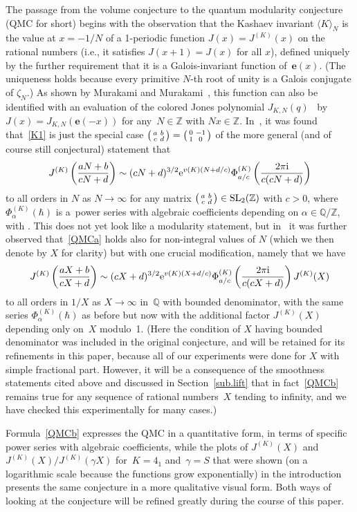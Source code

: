 \documentclass[pdftex]{sigma}
\numberwithin{equation}{section}
\def\BZ{\mathbb Z}
\def\BQ{\mathbb Q}
\def\la{\langle}
\def\ra{\rangle}
\def\SL{\mathrm{SL}}
\def\z{\zeta}
\def\e{\mathbf{e}}
\def\a{\alpha}
\def\Z{\mathbb Z}
\def\Q{\mathbb Q}
\def\e{\mathbf{e}}
\def\a{\alpha}
\def\z{\zeta}
\def\sma#1#2#3#4{\bigl(\smallmatrix#1&#2\\#3&#4\endsmallmatrix\bigr)} %
\def\J{\mathbf J} \def\J{J} %
\def\be{\begin{equation}}
\def\ee{\end{equation}}
\def\g{\gamma}
\begin{document}
The passage from the volume conjecture to the quantum modularity conjecture
(QMC for short) begins with the observation that the Kashaev invariant
$\la K\ra_N$ is the value at $x=-1/N$ of a 1-periodic function
$\J(x)=\J^{(K)}(x)$ on the rational numbers (i.e., it satisfies $\J(x+1)=\J(x)$ for
all $x$), defined uniquely by the further
requirement that it is a Galois-invariant function of~$\e(x)$. (The uniqueness
holds because every primitive $N$-th root of unity is a Galois conjugate of
$\z_N$.) As shown by Murakami and Murakami~\cite{MM}, this function
can also be identified with an evaluation of the colored Jones polynomial
$J_{K,N}(q)$~\cite{Jones, Tu1} by $\J(x) = J_{K,N}(\e(-x))$ for any~${N \in
\BZ}$ with $N x \in \BZ$.
In~\cite{Za:QMF}, it was found that~\eqref{K1} is just the special case
$\sma abcd=\sma0{-1}10$ of the more general (and of course still conjectural)
statement that
\be\label{QMCa}
\J^{(K)}\left(\frac{aN+b}{cN+d}\right) \sim (cN+d)^{3/2} {\rm e}^{v(K)(N+d/c)}
\Phi^{(K)}_{a/c}\left(\frac{2 \pi {\rm i}}{c(cN+d)}\right)
\ee
to all orders in $N$ as $N \to \infty$ for any matrix $\sma abcd \in \SL_2(\Z)$
with $c>0$, where $\Phi^{(K)}_\a(\hbar)$ is a~power series with
algebraic coefficients depending on $\a \in \BQ/\BZ$, with
. This does not yet look like a modularity statement,
but in~\cite{Za:QMF} it was further observed that~\eqref{QMCa} holds also
for non-integral values of $N$ (which we then denote by $X$ for clarity)
but with one crucial modification, namely that we have
\be
\label{QMCb}
\J^{(K)}\left(\frac{aX+b}{cX+d}\right) \sim (cX+d)^{3/2}
{\rm e}^{v(K)(X+d/c)} \Phi^{(K)}_{a/c}\left(\frac{2 \pi {\rm i}}{c(cX+d)}\right) \J^{(K)}(X)
\ee
to all orders in $1/X$ as $X\to\infty$ in~$\Q$ with bounded denominator,
with the same series $\Phi^{(K)}_\a(\hbar)$ as before but now with the
additional factor $\J^{(K)}(X)$ depending only on~$X$ modulo~1. (Here the condition
of $X$ having bounded denominator was included in the original conjecture, and will
be retained for its refinements in this paper, because all of our experiments were
done for $X$ with simple fractional part. However, it will be a consequence of
the smoothness statements cited above and discussed in Section~\ref{sub.lift} that in
fact~\eqref{QMCb} remains true for any sequence of rational numbers~$X$ tending to
infinity, and we have checked this experimentally for many cases.)

Formula~\eqref{QMCb} expresses the QMC in a quantitative form, in terms
of specific power series with algebraic coefficients, while the
plots of $J^{(K)}(X)$ and $J^{(K)}(X)/J^{(K)}(\g X)$ for~$K=4_1$ and~${\g=S}$ that
were shown (on a logarithmic scale because the functions grow exponentially) in
the introduction presents the same conjecture in a more qualitative visual form.
Both ways of looking at the conjecture will be refined greatly during the course of
this paper.
\end{document}
